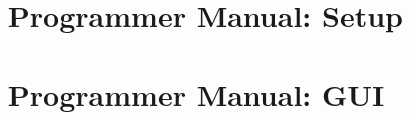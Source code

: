 
 \cleardoublepage

\chapter{\dabc~ Programmer Manual: Setup}
 \cleardoublepage

\chapter{\dabc~ Programmer Manual: GUI}
 \cleardoublepage
